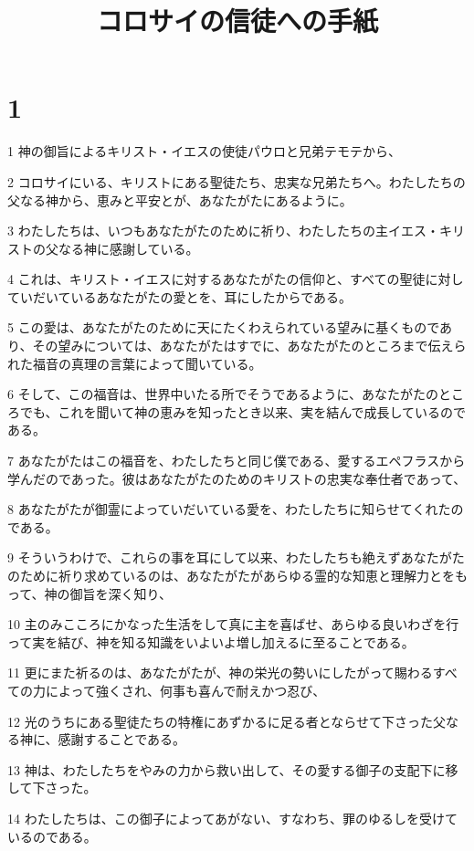 

\title{コロサイの信徒への手紙}


\chapter{1}

\par 1 神の御旨によるキリスト・イエスの使徒パウロと兄弟テモテから、
\par 2 コロサイにいる、キリストにある聖徒たち、忠実な兄弟たちへ。わたしたちの父なる神から、恵みと平安とが、あなたがたにあるように。
\par 3 わたしたちは、いつもあなたがたのために祈り、わたしたちの主イエス・キリストの父なる神に感謝している。
\par 4 これは、キリスト・イエスに対するあなたがたの信仰と、すべての聖徒に対していだいているあなたがたの愛とを、耳にしたからである。
\par 5 この愛は、あなたがたのために天にたくわえられている望みに基くものであり、その望みについては、あなたがたはすでに、あなたがたのところまで伝えられた福音の真理の言葉によって聞いている。
\par 6 そして、この福音は、世界中いたる所でそうであるように、あなたがたのところでも、これを聞いて神の恵みを知ったとき以来、実を結んで成長しているのである。
\par 7 あなたがたはこの福音を、わたしたちと同じ僕である、愛するエペフラスから学んだのであった。彼はあなたがたのためのキリストの忠実な奉仕者であって、
\par 8 あなたがたが御霊によっていだいている愛を、わたしたちに知らせてくれたのである。
\par 9 そういうわけで、これらの事を耳にして以来、わたしたちも絶えずあなたがたのために祈り求めているのは、あなたがたがあらゆる霊的な知恵と理解力とをもって、神の御旨を深く知り、
\par 10 主のみこころにかなった生活をして真に主を喜ばせ、あらゆる良いわざを行って実を結び、神を知る知識をいよいよ増し加えるに至ることである。
\par 11 更にまた祈るのは、あなたがたが、神の栄光の勢いにしたがって賜わるすべての力によって強くされ、何事も喜んで耐えかつ忍び、
\par 12 光のうちにある聖徒たちの特権にあずかるに足る者とならせて下さった父なる神に、感謝することである。
\par 13 神は、わたしたちをやみの力から救い出して、その愛する御子の支配下に移して下さった。
\par 14 わたしたちは、この御子によってあがない、すなわち、罪のゆるしを受けているのである。

